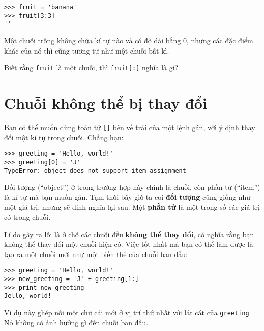 \documentclass[11pt]{book}
\begin{document}

\beforeverb
\begin{verbatim}
>>> fruit = 'banana'
>>> fruit[3:3]
''
\end{verbatim}
\afterverb
%
Một chuỗi trống không chứa kí tự nào và có độ dài bằng 0, nhưng
các đặc điểm khác của nó thì cũng tương tự như một chuỗi bất kì.

\begin{ex}
Biết rằng {\tt fruit} là một chuỗi, thì
{\tt fruit[:]} nghĩa là gì?


\end{ex}


\section{Chuỗi không thể bị thay đổi}

Bạn có thể muốn dùng toán tử {\tt []} bên vế trái của một lệnh gán,
với ý định thay đổi một kí tự trong chuỗi. Chẳng hạn:


\beforeverb
\begin{verbatim}
>>> greeting = 'Hello, world!'
>>> greeting[0] = 'J'
TypeError: object does not support item assignment
\end{verbatim}
\afterverb
%

Đối tượng (``object'') ở trong trường hợp này chính là chuỗi, còn
phần tử (``item'') là kí tự mà bạn muốn gán. Tạm thời bây giờ ta
coi {\bf đối tượng} cũng giống như một giá trị, nhưng sẽ định nghĩa
lại sau. Một {\bf phần tử} là một trong số các giá trị có trong chuỗi.


Lí do gây ra lỗi là ở chỗ các chuỗi đều {\bf không thể thay đổi}, 
có nghĩa rằng bạn không thể thay đổi một chuỗi hiện có. Việc
tốt nhất mà bạn có thể làm được là tạo ra một chuỗi mới như một
biến thể của chuỗi ban đầu:

\beforeverb
\begin{verbatim}
>>> greeting = 'Hello, world!'
>>> new_greeting = 'J' + greeting[1:]
>>> print new_greeting
Jello, world!
\end{verbatim}
\afterverb
%
Ví dụ này ghép nối một chữ cái mới ở vị trí thứ nhất với lát cát
của {\tt greeting}. Nó không có ảnh hưởng gì đến chuỗi ban đầu.
\end{document}
